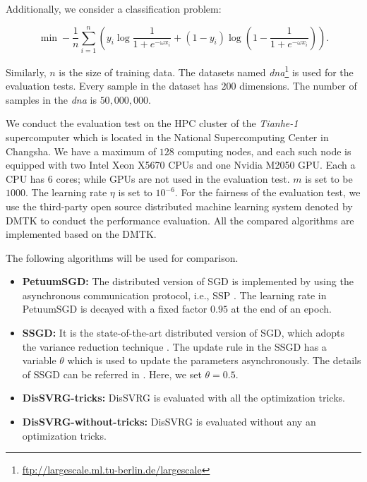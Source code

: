 \documentclass[preprint,review,11pt,a4paper]{elsarticle}
\begin{document}
Additionally, we consider a classification problem:

\begin{equation}
\label{classification}
\min -\frac{1}{n}\sum\limits_{i=1}^n\left(y_i\log\frac{1}{1+e^{-\omega x_i}}+(1-y_i)\log(1-\frac{1}{1+e^{-\omega x_i}})\right).
\end{equation}

Similarly, $n$ is the size of training data. The datasets named \emph{dna}\footnote{\url{ftp://largescale.ml.tu-berlin.de/largescale}} is used for the evaluation tests. Every sample in the dataset has $200$ dimensions.  The number of samples in the \emph{dna} is $50,000,000$.

We conduct the evaluation test on the HPC cluster of the \emph{Tianhe-1} supercomputer which is located in the National Supercomputing Center in Changsha. We have a maximum of $128$ computing nodes, and each such node is equipped with two Intel Xeon X5670 CPUs  and  one Nvidia M2050 GPU. Each a CPU has $6$ cores; while GPUs are not used in the evaluation test. $m$  is set to be $1000$. The learning rate $\eta$ is set to $10^{-6}$. For the fairness of the evaluation test, we use the third-party open source distributed machine learning system denoted by DMTK \cite{Yuan:2015ka} to conduct the performance evaluation. All the compared algorithms are implemented based on the DMTK.

The following algorithms will be  used for comparison.
\begin{itemize}
\item \textbf{PetuumSGD:} The distributed version of SGD is implemented by using the asynchronous communication protocol, i.e., SSP \cite{Xing:2015ib}.  The learning rate in PetuumSGD is decayed with a fixed factor $0.95$ at the end of an epoch.
\item \textbf{SSGD:} It is the state-of-the-art distributed version of SGD, which adopts the variance reduction technique \cite{Zhang:2015tp}. The update rule in the SSGD has a variable $\theta$ which is used to update the parameters asynchronously. The details of SSGD can be referred in \cite{Zhang:2015tp}. Here, we set $\theta=0.5$.
\item \textbf{DisSVRG-tricks:} DisSVRG is evaluated with all the optimization tricks.
\item \textbf{DisSVRG-without-tricks:} DisSVRG is evaluated without any an optimization tricks.
\end{itemize}
\end{document}
